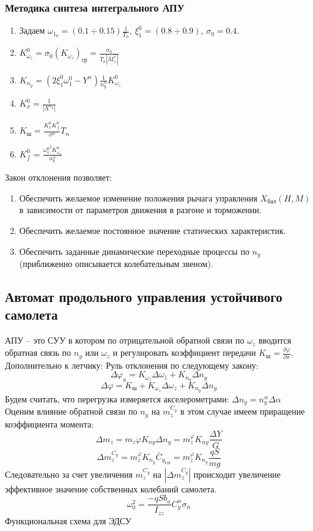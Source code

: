 \documentclass{article}
\begin{document}
\subsubsection{Методика синтеза интегрального АПУ}
\begin{enumerate}
	\item Задаем $\omega_{{1}_{0}} = (0.1 \div 0.15) \frac{1}{T_n}$, $\xi_1^0 =
		      (0.8 \div 0.9)$, $\sigma_0 = 0.4$.
	\item $K_{\omega_z}^0 = \sigma_0 (K_{\omega_z})_\text{гр} =
		      \frac{\sigma_0}{T_n|\bar{M}_z^\varphi|}$
	\item $K_{n_y} = (2\xi_1^0 \omega_1^0 - Y^\alpha)\frac{1}{n_y^\alpha}
		      K_{\omega_z}^0$
	\item $K_x^0 = \frac{1}{|X^{n_y}|}$
	\item $K_\text{ш} = \frac{K_x^0 K_{\int}^0}{\sigma^0}T_n$
	\item $K_{\int}^0 = \frac{{\omega_1^0}^2 K_{\omega_z}^0}{n_y^\alpha}$
\end{enumerate}
Закон отклонения позволяет:
\begin{enumerate}
	\item Обеспечить желаемое изменение положения рычага управления
	      $X_\text{бал}(H,M)$ в зависимости от параметров движения в разгоне и
	      торможении.
	\item Обеспечить желаемое постоянное значение статических характеристик.
	\item Обеспечить заданные динамические переходные процессы по $n_y$
	      (приближенно описывается колебательным звеном).
\end{enumerate}
\subsection{Автомат продольного управления устойчивого самолета}
АПУ -- это СУУ в котором по отрицательной обратной связи по $\omega_z$ вводится
обратная связь по $n_y$ или $\omega_z$ и регулировать коэффициент передачи
$K_\text{ш}=\frac{\partial \varphi}{\partial x}$.\\
Дополнительно к летчику:
Руль отклонения по следующему закону:
\[
	\Delta \varphi_a  = K_{\omega_z} \Delta \omega_z + K_{n_y} \Delta n_y
\]
\[
	\Delta \varphi = K_\text{ш} + K_{\omega_z}\Delta \omega_z + K_{n_y} \Delta
	n_y
\]
Будем считать, что перегрузка измеряется акселерометрами: $\Delta n_y =
	n_y^\alpha \Delta \alpha$
Оценим влияние обратной связи по $n_y$ на $m_z^{C_y}$ в этом случае имеем
приращение коэффициента момента:
\[
	\Delta m_z = m_z \varphi K_{ny}\Delta n_y = m_z^\varphi K_{ny} \frac{\Delta
		Y}{G}
\]
\[
	\Delta m_z^{C_y} = m_z^\varphi K_{n_y} \bar{C}_{y_\text{ГП}} = m_z^\varphi
	K_{n_y} \frac{qS}{mg}
\]
Следовательно за счет увеличения $m_z^{C_y}$ на $|\Delta m_z^{C_y}|$ происходит
увеличение эффективное значение собственных колебаний самолета.
\[
	\omega_0^2 = \frac{-qS b_a}{I_{zz}} C_y^\alpha \sigma_n
\]
Функциональная схема для ЭДСУ
\end{document}

